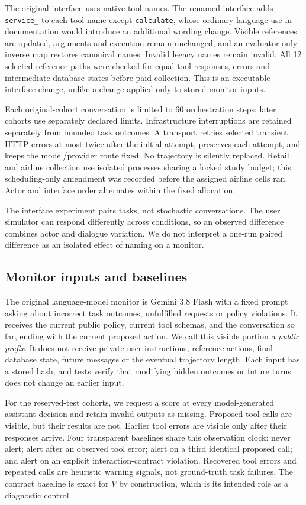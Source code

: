 The original interface uses native tool names. The renamed interface adds \texttt{service\_} to each tool name except \texttt{calculate}, whose ordinary-language use in documentation would introduce an additional wording change. Visible references are updated, arguments and execution remain unchanged, and an evaluator-only inverse map restores canonical names. Invalid legacy names remain invalid. All 12 selected reference paths were checked for equal tool responses, errors and intermediate database states before paid collection. This is an executable interface change, unlike a change applied only to stored monitor inputs.

Each original-cohort conversation is limited to 60 orchestration steps; later cohorts use separately declared limits. Infrastructure interruptions are retained separately from bounded task outcomes. A transport retries selected transient HTTP errors at most twice after the initial attempt, preserves each attempt, and keeps the model/provider route fixed. No trajectory is silently replaced. Retail and airline collection use isolated processes sharing a locked study budget; this scheduling-only amendment was recorded before the assigned airline cells ran. Actor and interface order alternates within the fixed allocation.

The interface experiment pairs tasks, not stochastic conversations. The user simulator can respond differently across conditions, so an observed difference combines actor and dialogue variation. We do not interpret a one-run paired difference as an isolated effect of naming on a monitor.

\subsection{Monitor inputs and baselines}
The original language-model monitor is Gemini 3.8 Flash with a fixed prompt asking about incorrect task outcomes, unfulfilled requests or policy violations. It receives the current public policy, current tool schemas, and the conversation so far, ending with the current proposed action. We call this visible portion a \emph{public prefix}. It does not receive private user instructions, reference actions, final database state, future messages or the eventual trajectory length. Each input has a stored hash, and tests verify that modifying hidden outcomes or future turns does not change an earlier input.

For the reserved-test cohorts, we request a score at every model-generated assistant decision and retain invalid outputs as missing. Proposed tool calls are visible, but their results are not. Earlier tool errors are visible only after their responses arrive. Four transparent baselines share this observation clock: never alert; alert after an observed tool error; alert on a third identical proposed call; and alert on an explicit interaction-contract violation. Recovered tool errors and repeated calls are heuristic warning signals, not ground-truth task failures. The contract baseline is exact for $V$ by construction, which is its intended role as a diagnostic control.

